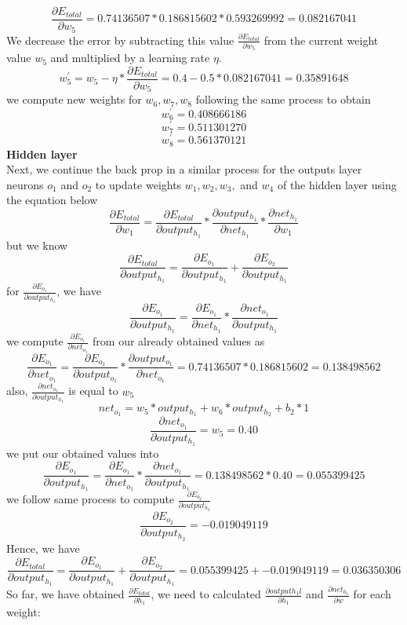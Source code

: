 \documentclass[master]{thesis-uestc}
\begin{document}
\[ \frac{\partial E_{total}}{\partial w_5} = 0.74136507 * 0.186815602 * 0.593269992 = 0.082167041 \]
We decrease the error by subtracting this value $\frac{\partial E_{total}}{\partial w_5}$ from the current weight value $w_5$ and multiplied by a learning rate $\eta$.
\[ w^{\prime}_{5} = w_5 - \eta * \frac{\partial E_{total}}{\partial w_5} = 0.4 - 0.5 * 0.082167041 = 0.35891648 \]
we compute new weights for $w_6, w_7, w_8$ following the same process to obtain
\[ w^{\prime}_{6} = 0.408666186 \]
\[ w^{\prime}_{7} = 0.511301270 \]
\[ w^{\prime}_{8} = 0.561370121 \]
\textbf{Hidden layer}\\
Next, we continue the back prop in a similar process for the outputs layer neurons $o_1$ and $o_2$ to update weights $w_1, w_2, w_3,$ and $w_4$ of the hidden layer using the equation below
\[ \frac{\partial E_{total}}{\partial w_1} = \frac{\partial E_{total}}{\partial output_{h_1}} * \frac{\partial output_{h_1}}{\partial net_{h_1}} * \frac{\partial net_{h_1}}{\partial w_1} \]
but we know 
\[ \frac{\partial E_{total}}{\partial output_{h_1}} = \frac{\partial E_{o_1}}{\partial output_{h_1}} + \frac{\partial E_{o_2}}{\partial output_{h_1}} \]
for $\frac{\partial E_{o_1}}{\partial output_{h_1}}$, we have 
\[ \frac{\partial E_{o_1}}{\partial output_{h_1}} = \frac{\partial E_{o_1}}{\partial net_{h_1}} * \frac{\partial net_{o_1}}{\partial output_{h_1}} \]
we compute $\frac{\partial E_{o_1}}{\partial net_{o_1}}$ from our already obtained values as
\[ \frac{\partial E_{o_1}}{\partial net_{o_1}} = \frac{\partial E_{o_1}}{\partial output_{o_1}} * \frac{\partial output_{o_1}}{\partial net_{o_1}} = 0.74136507 * 0.186815602 = 0.138498562\]
also, $\frac{\partial net_{o_1}}{\partial output_{h_1}}$ is equal to $w_5$
\[ net_{o_1} = w_5 * output_{h_1} + w_6 * output_{h_2} + b_2 * 1 \]
\[ \frac{\partial net_{o_1}}{\partial output_{h_1}} = w_5 = 0.40 \]
we put our obtained values into
\[ \frac{\partial E_{o_1}}{\partial output_{h_1}} = \frac{\partial E_{o_1}}{\partial net_{o_1}} * \frac{\partial net_{o_1}}{\partial output_{h_1}} = 0.138498562 * 0.40 = 0.055399425 \]
we follow same process to compute $\frac{\partial E_{o_2}}{\partial output_{h_2}}$
\[ \frac{\partial E_{o_2}}{\partial output_{h_2}} = -0.019049119 \]
Hence, we have
\[ \frac{\partial E_{total}}{\partial output_{h_1}} = \frac{\partial E_{o_1}}{\partial output_{h_1}} + \frac{\partial E_{o_2}}{\partial output_{h_1}} = 0.055399425 + -0.019049119 = 0.036350306\]
So far, we have obtained $\frac{\partial E_{total}}{\partial h_1}$, we need to calculated $\frac{\partial output{h_1l}}{\partial h_1}$ and $\frac{\partial net_{h_1}}{\partial w}$ for each weight:
\end{document}

